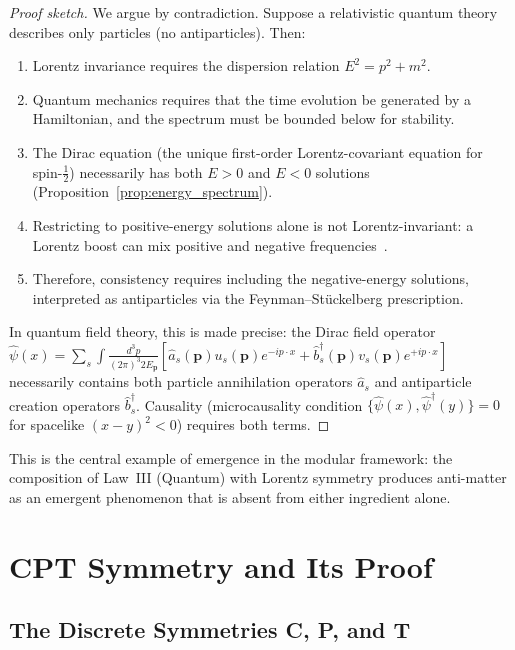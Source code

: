 \documentclass[12pt]{article}
\theoremstyle{definition}
\theoremstyle{remark}
\begin{document}
\begin{proof}[Proof sketch]
We argue by contradiction. Suppose a relativistic quantum theory describes only
particles (no antiparticles). Then:
\begin{enumerate}
    \item Lorentz invariance requires the dispersion relation $E^2 = p^2 + m^2$.
    \item Quantum mechanics requires that the time evolution be generated by a
    Hamiltonian, and the spectrum must be bounded below for stability.
    \item The Dirac equation (the unique first-order Lorentz-covariant equation for
    spin-$\frac{1}{2}$) necessarily has both $E > 0$ and $E < 0$ solutions
    (Proposition~\ref{prop:energy_spectrum}).
    \item Restricting to positive-energy solutions alone is not Lorentz-invariant:
    a Lorentz boost can mix positive and negative frequencies~\cite{Weinberg1995}.
    \item Therefore, consistency requires including the negative-energy solutions,
    interpreted as antiparticles via the Feynman--St\"uckelberg prescription.
\end{enumerate}
In quantum field theory, this is made precise: the Dirac field operator
$\hat{\psi}(x) = \sum_s \int \frac{d^3p}{(2\pi)^3 2E_\mathbf{p}} \left[
\hat{a}_s(\mathbf{p}) u_s(\mathbf{p}) e^{-ip\cdot x} +
\hat{b}_s^\dagger(\mathbf{p}) v_s(\mathbf{p}) e^{+ip\cdot x} \right]$
necessarily contains both particle annihilation operators $\hat{a}_s$ and
antiparticle creation operators $\hat{b}_s^\dagger$. Causality (microcausality
condition $\{\hat{\psi}(x), \hat{\psi}^\dagger(y)\} = 0$ for spacelike
$(x-y)^2 < 0$) requires both terms.
\end{proof}

This is the central example of emergence in the modular framework: the composition
of Law~III (Quantum) with Lorentz symmetry produces anti-matter as an emergent
phenomenon that is absent from either ingredient alone.

\section{CPT Symmetry and Its Proof}
\label{sec:cpt}

\subsection{The Discrete Symmetries C, P, and T}
\end{document}
